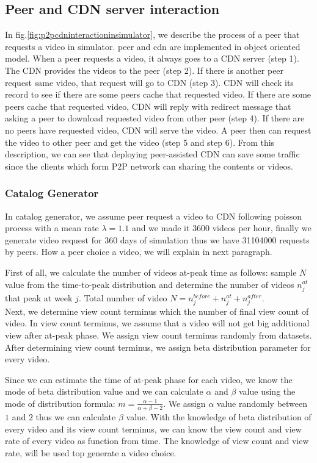 \documentclass[10pt,final,journal,a4paper]{IEEEtran}
\begin{document}
\subsection{Peer and CDN server interaction}
In fig.\ref{fig:p2pcdninteractioninsimulator}, we describe the process of a peer that requests a video in simulator.
peer and cdn are implemented in object oriented model. 
When a peer requests a video, it always goes to a CDN server (step 1). 
The CDN provides the videos to the peer (step 2). 
If there is another peer request same video, that request will go to CDN (step 3).  
CDN will check its record to see if there are some peers cache that requested video.  
If there are some peers cache that requested video, CDN will reply with redirect message that asking a peer to download requested video from other peer (step 4).
If there are no peers have requested video, CDN will serve the video.   
A peer then can request the video to other peer and get the video (step 5 and step 6).
From this description, we can see that deploying peer-assisted CDN can save some traffic since the clients which form P2P network can sharing the contents or videos.


\subsubsection{Catalog Generator}
In catalog generator, we assume peer request a video to CDN following poisson process with a mean rate $\lambda=1.1$ \cite{Zink:2009:CYN:1502814.1502987} and we made it 3600 videos per hour, finally we generate video request for 360 days of simulation thus we have 31104000 requests by peers. 
How a peer choice a video, we will explain in next paragraph.

First of all, we calculate the number of videos at-peak time as follows: sample $N$ value from the time-to-peak distribution and determine the number of videos $n_j^{at}$ that peak at week $j$. 
Total number of video $N = n_j^{before} + n_j^{at} + n_j^{after}$.\\
Next, we determine view count terminus which the number of final view count of video.
In view count terminus, we assume that a video will not get big additional view after at-peak phase.
We assign view count terminus randomly from datasets.
After determining view count terminus, we assign beta distribution parameter for every video. 

Since we can estimate the time of at-peak phase for each video, we know the mode of beta distribution value and we can calculate $\alpha$ and $\beta$ value using the mode of distribution formula: $m=\frac{\alpha-1}{\alpha + \beta - 2}$.  
We assign $\alpha$ value randomly between $1$ and $2$ thus we can calculate $\beta$ value.
With the knowledge of beta distribution of every video and its view count terminus, we can know the view count and view rate of every video as function from time.
The knowledge of view count and view rate, will be used top generate a video choice.  
\end{document}
